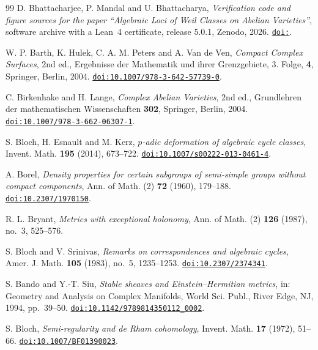 \begin{thebibliography}{99}
D. Bhattacharjee, P. Mandal and U. Bhattacharya,
\emph{Verification code and figure sources for the paper ``Algebraic Loci of
Weil Classes on Abelian Varieties''}, software archive with a Lean~4
certificate, release 5.0.1, Zenodo, 2026.
\href{https://doi.org/\zenodoCodeID}{\texttt{doi:\zenodoCodeID}}.

W. P. Barth, K. Hulek, C. A. M. Peters and A. Van de Ven,
\emph{Compact Complex Surfaces}, 2nd ed.,
Ergebnisse der Mathematik und ihrer Grenzgebiete, 3. Folge, \textbf{4},
Springer, Berlin, 2004.
\href{https://doi.org/10.1007/978-3-642-57739-0}{\texttt{doi:10.1007/978-3-642-57739-0}}.

C. Birkenhake and H. Lange,
\emph{Complex Abelian Varieties}, 2nd ed.,
Grundlehren der mathematischen Wissenschaften \textbf{302},
Springer, Berlin, 2004.
\href{https://doi.org/10.1007/978-3-662-06307-1}{\texttt{doi:10.1007/978-3-662-06307-1}}.

S. Bloch, H. Esnault and M. Kerz,
\emph{$p$-adic deformation of algebraic cycle classes},
Invent. Math. \textbf{195} (2014), 673--722.
\href{https://doi.org/10.1007/s00222-013-0461-4}{\texttt{doi:10.1007/s00222-013-0461-4}}.

A. Borel,
\emph{Density properties for certain subgroups of semi-simple groups without
compact components},
Ann. of Math. (2) \textbf{72} (1960), 179--188.
\href{https://doi.org/10.2307/1970150}{\texttt{doi:10.2307/1970150}}.

R. L. Bryant,
\emph{Metrics with exceptional holonomy},
Ann. of Math. (2) \textbf{126} (1987), no.~3, 525--576.

S. Bloch and V. Srinivas,
\emph{Remarks on correspondences and algebraic cycles},
Amer. J. Math. \textbf{105} (1983), no.~5, 1235--1253.
\href{https://doi.org/10.2307/2374341}{\texttt{doi:10.2307/2374341}}.

S. Bando and Y.-T. Siu,
\emph{Stable sheaves and Einstein--Hermitian metrics},
in: Geometry and Analysis on Complex Manifolds,
World Sci. Publ., River Edge, NJ, 1994, pp.~39--50.
\href{https://doi.org/10.1142/9789814350112_0002}{\texttt{doi:10.1142/9789814350112\_0002}}.

S. Bloch,
\emph{Semi-regularity and de Rham cohomology},
Invent. Math. \textbf{17} (1972), 51--66.
\href{https://doi.org/10.1007/BF01390023}{\texttt{doi:10.1007/BF01390023}}.


\end{thebibliography}
